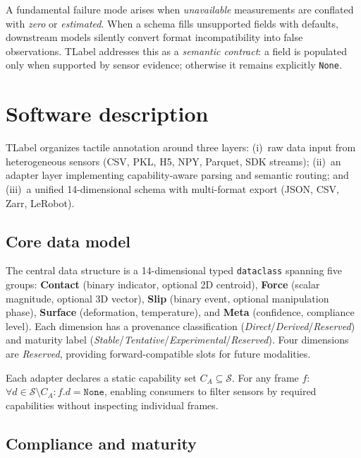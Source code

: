 \documentclass[preprint,12pt,a4paper]{elsarticle}
\begin{document}
A fundamental failure mode arises when \textit{unavailable} measurements are conflated with \textit{zero} or \textit{estimated}. When a schema fills unsupported fields with defaults, downstream models silently convert format incompatibility into false observations. TLabel addresses this as a \textit{semantic contract}: a field is populated only when supported by sensor evidence; otherwise it remains explicitly \texttt{None}.

\section{Software description}
\label{sec:software}

TLabel organizes tactile annotation around three layers: (i)~raw data input from heterogeneous sensors (CSV, PKL, H5, NPY, Parquet, SDK streams); (ii)~an adapter layer implementing capability-aware parsing and semantic routing; and (iii)~a unified 14-dimensional schema with multi-format export (JSON, CSV, Zarr, LeRobot).

\subsection{Core data model}

The central data structure is a 14-dimensional typed \texttt{dataclass} spanning five groups: \textbf{Contact} (binary indicator, optional 2D centroid), \textbf{Force} (scalar magnitude, optional 3D vector), \textbf{Slip} (binary event, optional manipulation phase), \textbf{Surface} (deformation, temperature), and \textbf{Meta} (confidence, compliance level). Each dimension has a provenance classification (\textit{Direct}/\textit{Derived}/\textit{Reserved}) and maturity label (\textit{Stable}/\textit{Tentative}/\textit{Experimental}/\textit{Reserved}). Four dimensions are \textit{Reserved}, providing forward-compatible slots for future modalities.

Each adapter declares a static capability set $C_A \subseteq \mathcal{S}$. For any frame $f$: $\forall d \in \mathcal{S} \setminus C_A: f.d = \texttt{None}$, enabling consumers to filter sensors by required capabilities without inspecting individual frames.

\subsection{Compliance and maturity}
\end{document}
